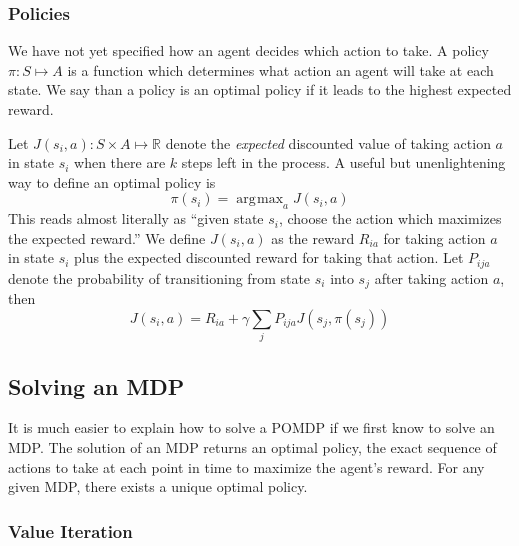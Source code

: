 \documentclass[tog]{acmsiggraph}
\DeclareMathOperator*{\argmax}{\arg\!\max}
\begin{document}
\subsubsection{Policies}
\label{sec:policies}

We have not yet specified how an agent decides which action to take. A policy 
$\pi : S \mapsto A$ is a function which determines what action an agent will take 
at each state. We say than a policy is an optimal policy if it leads to the highest expected reward.

Let $J \left( s_i, a \right) : S \times A \mapsto \mathbb{R}$ denote the \textit{expected} 
discounted value of taking action $a$ in state $s_i$ when there are $k$ steps 
left in the process. A useful but unenlightening way to define an optimal policy is
\begin{equation*}
  \pi \left(s_i \right) = \argmax_a J \left( s_i, a \right)
\end{equation*}
This reads almost literally as ``given state $s_i$, choose the action which maximizes 
the expected reward.'' We define $J \left( s_i, a \right)$ as the reward $R_{ia}$ for 
taking action $a$ in state $s_i$ plus the expected discounted reward for taking that 
action. Let $P_{ija}$ denote the probability of transitioning from state $s_i$ into $s_j$ 
after taking action $a$, then
\begin{equation} \label{eqn:J}
  J \left( s_i, a \right) = R_{ia} + \gamma \sum_j P_{ija} J \left( s_j, \pi \left( s_j \right) \right)
\end{equation}

\subsection{Solving an MDP}
It is much easier to explain how to solve a POMDP if we first know to solve an MDP. 
The solution of an MDP returns an optimal policy, the exact sequence of actions to take 
at each point in time to maximize the agent's reward. For any given MDP, there exists a 
unique optimal policy.

\subsubsection{Value Iteration}
\end{document}
